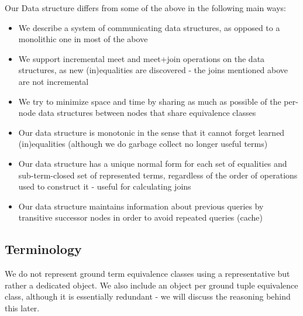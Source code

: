 Our Data structure differs from some of the above in the following main ways:
\begin{itemize}
	\item We describe a system of communicating data structures, as opposed to a monolithic one in most of the above
	\item We support incremental meet and meet+join operations on the data structures, as new (in)equalities are discovered - the joins mentioned above are not incremental
	\item We try to minimize space and time by sharing as much as possible of the per-node data structures between nodes that share equivalence classes
	\item Our data structure is monotonic in the sense that it cannot forget learned (in)equalities (although we do garbage collect no longer useful terms)
	\item Our data structure has a unique normal form for each set of equalities and sub-term-closed set of represented terms, regardless of the order of operations used to construct it - useful for calculating joins
	\item Our data structure maintains information about previous queries by transitive successor nodes in order to avoid repeated queries (cache)
\end{itemize}

\subsection{Terminology}
We do not represent ground term equivalence classes using a representative but rather a dedicated object.
We also include an object per ground tuple equivalence class, although it is essentially redundant - we will discuss the reasoning behind this later.

